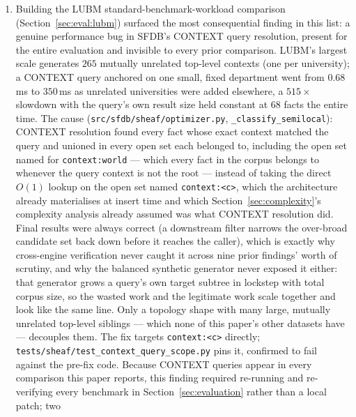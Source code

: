 \begin{enumerate}
    \item Building the LUBM standard-benchmark-workload comparison
          (Section~\ref{sec:eval:lubm}) surfaced the most consequential
          finding in this list: a genuine performance bug in SFDB's
          CONTEXT query resolution, present for the entire evaluation and
          invisible to every prior comparison. LUBM's largest scale
          generates $265$ mutually unrelated top-level contexts (one per
          university); a CONTEXT query anchored on one small, fixed
          department went from $0.68$\,ms to $350$\,ms as unrelated
          universities were added elsewhere, a $515\times$ slowdown with
          the query's own result size held constant at $68$ facts the
          entire time. The cause
          (\texttt{src/sfdb/sheaf/optimizer.py},
          \texttt{\_classify\_semilocal}): CONTEXT resolution found every
          fact whose exact context matched the query and unioned in
          every open set each belonged to, including the open set named
          for \texttt{context:world} --- which every fact in the corpus
          belongs to whenever the query context is not the root ---
          instead of taking the direct $O(1)$ lookup on the open set
          named \texttt{context:<c>}, which the architecture already
          materialises at insert time and which
          Section~\ref{sec:complexity}'s complexity analysis already
          assumed was what CONTEXT resolution did. Final results were
          always correct (a downstream filter narrows the over-broad
          candidate set back down before it reaches the caller), which
          is exactly why cross-engine verification never caught it across
          nine prior findings' worth of scrutiny, and why the balanced
          synthetic generator never exposed it either: that generator
          grows a query's own target subtree in lockstep with total
          corpus size, so the wasted work and the legitimate work scale
          together and look like the same line. Only a topology shape
          with many large, mutually unrelated top-level siblings ---
          which none of this paper's other datasets have --- decouples
          them. The fix targets \texttt{context:<c>} directly;
          \texttt{tests/sheaf/test\_context\_query\_scope.py} pins it,
          confirmed to fail against the pre-fix code. Because CONTEXT
          queries appear in every comparison this paper reports, this
          finding required re-running and re-verifying every benchmark in
          Section~\ref{sec:evaluation} rather than a local patch; two

\end{enumerate}
